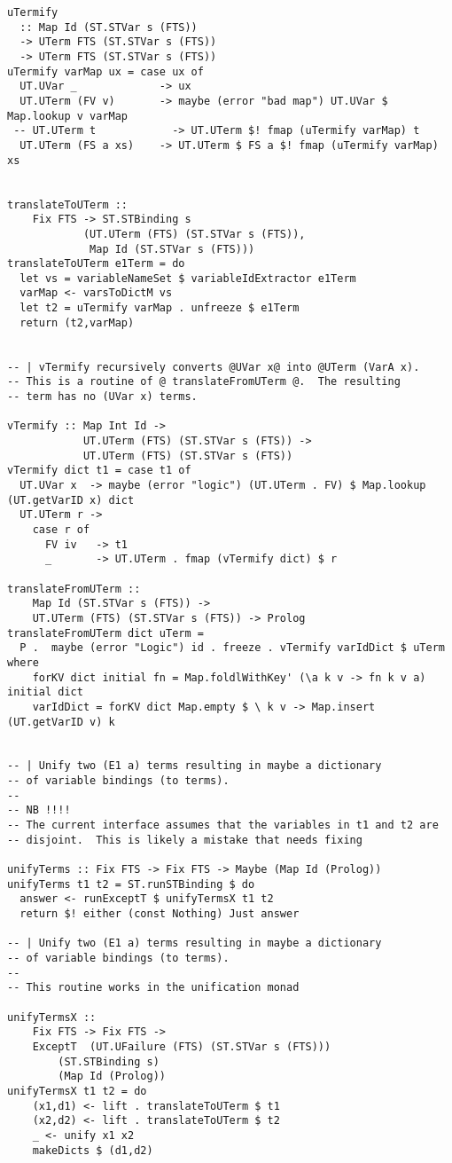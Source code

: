 \documentclass[thesis-solanki.tex]{files}
\begin{document}
\begin{verbatim}
uTermify 
  :: Map Id (ST.STVar s (FTS)) 
  -> UTerm FTS (ST.STVar s (FTS)) 
  -> UTerm FTS (ST.STVar s (FTS))
uTermify varMap ux = case ux of
  UT.UVar _             -> ux
  UT.UTerm (FV v)       -> maybe (error "bad map") UT.UVar $ Map.lookup v varMap
 -- UT.UTerm t            -> UT.UTerm $! fmap (uTermify varMap) t
  UT.UTerm (FS a xs)    -> UT.UTerm $ FS a $! fmap (uTermify varMap) xs   


translateToUTerm ::
    Fix FTS -> ST.STBinding s
            (UT.UTerm (FTS) (ST.STVar s (FTS)),
             Map Id (ST.STVar s (FTS)))
translateToUTerm e1Term = do
  let vs = variableNameSet $ variableIdExtractor e1Term
  varMap <- varsToDictM vs
  let t2 = uTermify varMap . unfreeze $ e1Term
  return (t2,varMap)


-- | vTermify recursively converts @UVar x@ into @UTerm (VarA x).
-- This is a routine of @ translateFromUTerm @.  The resulting
-- term has no (UVar x) terms.

vTermify :: Map Int Id ->
            UT.UTerm (FTS) (ST.STVar s (FTS)) ->
            UT.UTerm (FTS) (ST.STVar s (FTS))
vTermify dict t1 = case t1 of
  UT.UVar x  -> maybe (error "logic") (UT.UTerm . FV) $ Map.lookup (UT.getVarID x) dict
  UT.UTerm r ->
    case r of
      FV iv   -> t1
      _       -> UT.UTerm . fmap (vTermify dict) $ r

translateFromUTerm :: 
    Map Id (ST.STVar s (FTS)) ->
    UT.UTerm (FTS) (ST.STVar s (FTS)) -> Prolog
translateFromUTerm dict uTerm =
  P .  maybe (error "Logic") id . freeze . vTermify varIdDict $ uTerm where
    forKV dict initial fn = Map.foldlWithKey' (\a k v -> fn k v a) initial dict
    varIdDict = forKV dict Map.empty $ \ k v -> Map.insert (UT.getVarID v) k


-- | Unify two (E1 a) terms resulting in maybe a dictionary
-- of variable bindings (to terms).
--
-- NB !!!!
-- The current interface assumes that the variables in t1 and t2 are
-- disjoint.  This is likely a mistake that needs fixing

unifyTerms :: Fix FTS -> Fix FTS -> Maybe (Map Id (Prolog))
unifyTerms t1 t2 = ST.runSTBinding $ do
  answer <- runExceptT $ unifyTermsX t1 t2
  return $! either (const Nothing) Just answer

-- | Unify two (E1 a) terms resulting in maybe a dictionary
-- of variable bindings (to terms).
--
-- This routine works in the unification monad

unifyTermsX ::
    Fix FTS -> Fix FTS ->
    ExceptT  (UT.UFailure (FTS) (ST.STVar s (FTS)))
        (ST.STBinding s)
        (Map Id (Prolog))
unifyTermsX t1 t2 = do
    (x1,d1) <- lift . translateToUTerm $ t1
    (x2,d2) <- lift . translateToUTerm $ t2
    _ <- unify x1 x2
    makeDicts $ (d1,d2)




\end{verbatim}
\end{document}
